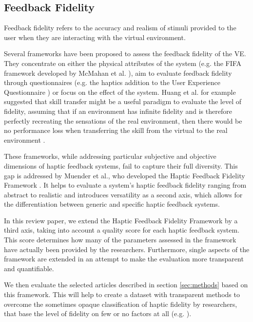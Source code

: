 \subsection{Feedback Fidelity}

Feedback fidelity refers to the accuracy and realism of stimuli provided to the user when they are interacting with the virtual environment. 

Several frameworks have been proposed to assess the feedback fidelity of the VE. They concentrate on either the physical attributes of the system (e.g. the FIFA framework developed by McMahan et al. \cite{McMahan2011ExploringGames}), aim to evaluate feedback fidelity through questionnaires (e.g. the haptics addition \cite{Boos2017ErweiterungHaptik} to the User Experience Questionnaire \cite{Laugwitz2008ConstructionQuestionnaire}) or focus on the effect of the system. Huang et al. for example suggested that skill transfer might be a useful paradigm to evaluate the level of fidelity, assuming that if an environment has infinite fidelity and is therefore perfectly recreating the sensations of the real environment, then there would be no performance loss when transferring the skill from the virtual to the real environment \cite{Huang2006}.

These frameworks, while addressing particular subjective and objective dimensions of haptic feedback systems, fail to capture their full diversity. This gap is addressed by Muender et al., who developed the Haptic Feedback Fidelity Framework \cite{Muender2022HapticReality}.
It helps to evaluate a system's haptic feedback fidelity ranging from abstract to realistic and introduces versatility as a second axis, which allows for the differentiation between generic and specific haptic feedback systems. 

In this review paper, we extend the Haptic Feedback Fidelity Framework by a third axis, taking into account a quality score for each haptic feedback system. This score determines how many of the parameters assessed in the framework have actually been provided by the researchers. Furthermore, single aspects of the framework are extended in an attempt to make the evaluation more transparent and quantifiable. 


We then evaluate the selected articles described in section \ref{sec:methods}  based on this framework. This will help to create a dataset with transparent methods to overcome the sometimes opaque classification of haptic fidelity by researchers, that base the level of fidelity on few or no factors at all (e.g. \cite{Grant2019}). 


